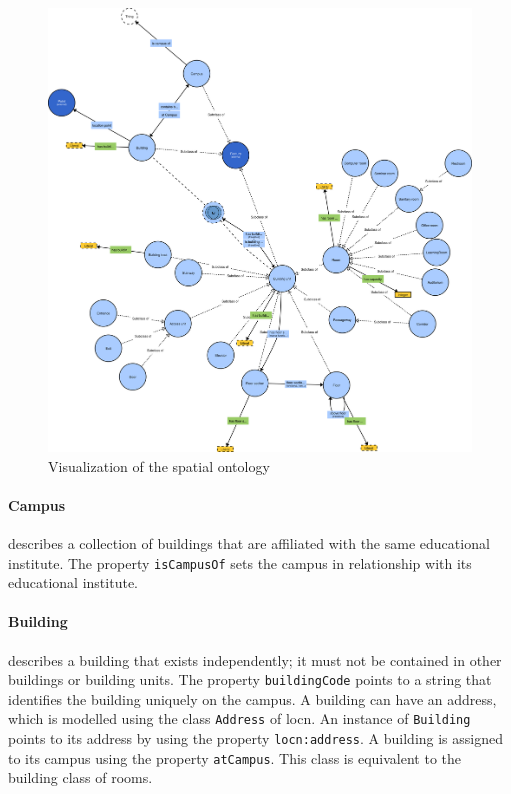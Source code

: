 \documentclass[draft,final]{vutinfth} %
\begin{document}
\begin{figure}[h]
    \centering
    \includegraphics[width=1.0\textwidth]{graphics/solution/ontology/tuViennaSpatialOntology.png}
    \caption{Visualization of the spatial ontology}
    \label{fig:solution-ontology-prototype:spatial}
\end{figure}

\paragraph{Campus} describes a collection of buildings that are affiliated with the same educational institute. The property \texttt{isCampusOf} sets the campus in relationship with its educational institute.

\paragraph{Building} describes a building that exists independently; it must not be  contained in other buildings or building units. The property \texttt{buildingCode} points to a string that identifies the building uniquely on the campus. A building can have an address, which is modelled using the class \texttt{Address} of \gls{locn}. An instance of \texttt{Building} points to its address by using the property \texttt{locn:address}. A building is assigned to its campus using the property \texttt{atCampus}. This class is equivalent to the building class of \gls{rooms}.
\end{document}
